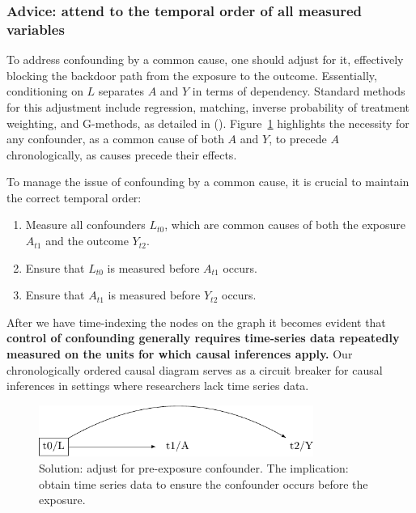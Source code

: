 \documentclass[
  singlecolumn,
  9pt]{article}
\providecommand{\tightlist}{%
  \setlength{\itemsep}{0pt}\setlength{\parskip}{0pt}}\usepackage{longtable,booktabs,array}
\begin{document}
\subsubsection{Advice: attend to the temporal order of all measured
variables}\label{advice-attend-to-the-temporal-order-of-all-measured-variables}

To address confounding by a common cause, one should adjust for it,
effectively blocking the backdoor path from the exposure to the outcome.
Essentially, conditioning on \(L\) separates \(A\) and \(Y\) in terms of
dependency. Standard methods for this adjustment include regression,
matching, inverse probability of treatment weighting, and G-methods, as
detailed in ().
Figure~\ref{fig-dag-common-cause-solution} highlights the necessity for
any confounder, as a common cause of both \(A\) and \(Y\), to precede
\(A\) chronologically, as causes precede their effects.

To manage the issue of confounding by a common cause, it is crucial to
maintain the correct temporal order:

\begin{enumerate}
\def\labelenumi{\arabic{enumi}.}
\tightlist
\item
  Measure all confounders \(L_{t0}\), which are common causes of both
  the exposure \(A_{t1}\) and the outcome \(Y_{t2}\).
\item
  Ensure that \(L_{t0}\) is measured before \(A_{t1}\) occurs.
\item
  Ensure that \(A_{t1}\) is measured before \(Y_{t2}\) occurs.
\end{enumerate}

After we have time-indexing the nodes on the graph it becomes evident
that \textbf{control of confounding generally requires time-series data
repeatedly measured on the units for which causal inferences apply.} Our
chronologically ordered causal diagram serves as a circuit breaker for
causal inferences in settings where researchers lack time series data.

\begin{figure}

{\centering \includegraphics[width=0.8\textwidth,height=\textheight]{causal-dags_files/figure-pdf/fig-dag-common-cause-solution-1.pdf}

}

\caption{\label{fig-dag-common-cause-solution}Solution: adjust for
pre-exposure confounder. The implication: obtain time series data to
ensure the confounder occurs before the exposure.}

\end{figure}
\end{document}
